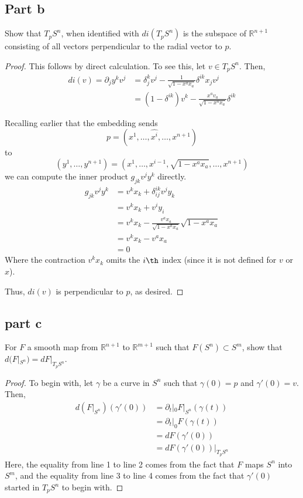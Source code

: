 \documentclass[fontsize=11pt]{scrartcl} %
\numberwithin{equation}{section} %
\numberwithin{figure}{section} %
\numberwithin{table}{section} %
\newcommand{\R}{\mathbb{R}}
\begin{document}
\subsection*{Part b}
Show that $T_pS^n$, when identified with $di(T_pS^n)$ is the subspace of $\R^{n+1}$ consisting
of all vectors perpendicular to the radial vector to $p$.
\\
\begin{proof}
This follows by direct calculation. To see this, let $v\in T_pS^n$. Then,
\[
\begin{aligned}
di(v) = \partial_jy^kv^j &= \delta_j^kv^j-\frac{1}{\sqrt{1-x^ax_a}}\delta^{ik}x_jv^j\\
                &= (1-\delta^{ik})v^k - \frac{x^av_a}{\sqrt{1-x^ax_a}}\delta^{ik}
\end{aligned}
\]

Recalling earlier that the embedding sends 
\[
p = (x^1,\ldots,\hat{x^i},\ldots,x^{n+1})
\]
to 
\[
(y^1,\ldots,y^{n+1}) = (x^1,\ldots,x^{i-1},\sqrt{1-x^ax_a},\ldots,x^{n+1})
\]
we can compute the inner product $g_{jk}v^jy^k$ directly.
\[
\begin{aligned}
g_{jk}v^jy^k &=v^kx_k + \delta^{ik}_{ij}v^jy_k\\
            &=v^kx_k + v^iy_i\\
            &=v^kx_k -\frac{v^ax_a}{\sqrt{1-x^ax_a}}\sqrt{1-x^ax_a}\\
            &=v^kx_k - v^ax_a\\
            &= 0 
\end{aligned}
\]
Where the contraction $v^kx_k$ omits the $i\th$ index (since it is not defined for 
$v$ or $x$).

Thus, $di(v)$ is perpendicular to $p$, as desired.
\end{proof}

\subsection*{part c}
For $F$ a smooth map from $\R^{n+1}$ to $\R^{m+1}$ such that $F(S^n)\subset S^m$, show
that $d(F|_{S^n}) = dF|_{T_pS^n}$.
\\
\begin{proof}
To begin with, let $\gamma$ be a curve in $S^n$ such that
$\gamma(0)=p$ and $\gamma'(0)=v$. Then,
\[
\begin{aligned}
d(F|_{S^n})(\gamma'(0)) &= \partial_t|_0 F|_{S^n}(\gamma(t))\\
                        &= \partial_t|_0 F(\gamma(t))\\
                        &= dF(\gamma'(0))\\
                        &= dF(\gamma'(0))|_{T_pS^n}
\end{aligned}
\]
Here, the equality from line 1 to line 2 comes from the fact that $F$ maps $S^n$ into $S^m$,
and the equality from line 3 to line 4 comes from the fact that $\gamma'(0)$ started in
$T_pS^n$ to begin with.
\end{proof}
\newpage
\end{document}
